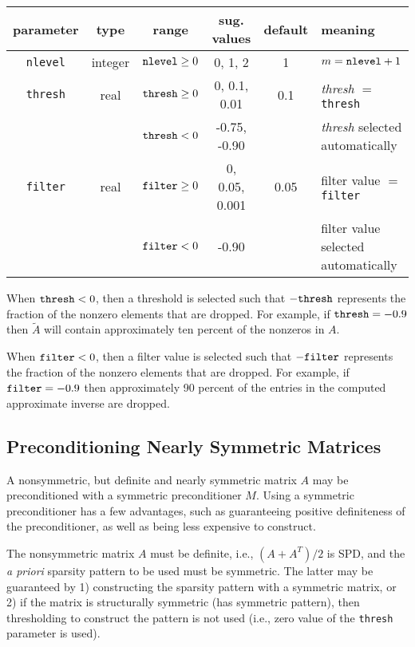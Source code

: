 \begin{center}
\begin{tabular}{|c|c|c|c|c|l|} \hline
parameter    & type    & range                & sug. values  & default & meaning \\ \hline
{\tt nlevel} & integer & ${\tt nlevel} \ge 0$ & 0, 1, 2      & 1   & $m={\tt nlevel}+1$\\
\hline
{\tt thresh} & real    & ${\tt thresh} \ge 0$ & 0, 0.1, 0.01 & 0.1 & {\em thresh} $=$ {\tt thresh}\\
             &         & ${\tt thresh}  <  0$ & -0.75, -0.90 &     & {\em thresh} selected automatically\\
\hline
{\tt filter} & real    & ${\tt filter} \ge 0$ & 0, 0.05, 0.001 & 0.05 & filter value $=$ {\tt filter}\\
             &         & ${\tt filter}  <  0$ & -0.90        &     & filter value selected automatically\\
\hline
\end{tabular}
\end{center}

When ${\tt thresh} < 0$, then a threshold is selected such that 
$-{\tt thresh}$ represents the fraction of the nonzero elements
that are dropped.  For example, if ${\tt thresh} = -0.9$ then
$\tilde{A}$ will contain approximately ten percent of the nonzeros
in $A$.

When ${\tt filter} < 0$, then a filter value is selected such that 
$-{\tt filter}$ represents the fraction of the nonzero elements
that are dropped.  For example, if ${\tt filter} = -0.9$ then
approximately 90 percent of the entries in the computed approximate 
inverse are dropped.


\subsection{Preconditioning Nearly Symmetric Matrices}
\label{nearly}

A nonsymmetric, but definite and nearly symmetric matrix $A$ 
may be preconditioned
with a symmetric preconditioner $M$.  Using a symmetric preconditioner
has a few advantages, such as guaranteeing positive
definiteness of the preconditioner, as well as being less expensive
to construct.

The nonsymmetric matrix $A$ must be definite,
i.e., $(A+A^T)/2$ is SPD, and the {\em a priori} sparsity pattern to be used
must be symmetric.  The latter may be guaranteed by 1) 
constructing the sparsity pattern with a symmetric matrix, or 2) if the
matrix is structurally symmetric (has symmetric pattern), then
thresholding to construct the pattern is not used (i.e.,
zero value of the {\tt thresh} parameter is used).

